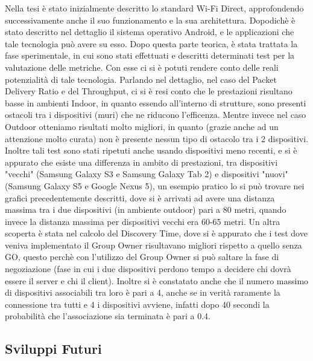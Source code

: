 Nella tesi è stato inizialmente descritto lo standard Wi-Fi Direct, approfondendo successivamente anche il suo funzionamento e la sua architettura.
Dopodichè è stato descritto nel dettaglio il sistema operativo Android, e le applicazioni che tale tecnologia può avere su esso.
Dopo questa parte teorica, è stata trattata la fase sperimentale, in cui sono stati effettuati e descritti determinati test per la valutazione delle metriche.
Con esse ci si è potuti rendere conto delle reali potenzialità di tale tecnologia.
Parlando nel dettaglio, nel caso del Packet Delivery Ratio e del Throughput, ci si è resi conto che le prestazioni risultano basse in ambienti Indoor, in quanto essendo all'interno di strutture, sono presenti ostacoli tra i dispositivi (muri) che ne riducono l'efficenza.
Mentre invece nel caso Outdoor otteniamo risultati molto migliori, in quanto (grazie anche ad un attenzione molto curata) non è presente nessun tipo di ostacolo tra i 2 dispositivi.
Inoltre tali test sono stati ripetuti anche usando dispositivi meno recenti, e si è appurato che esiste una differenza in ambito di prestazioni, tra dispositivi "vecchi" (Samsung Galaxy S3 e Samsung Galaxy Tab 2) e dispositivi "nuovi" (Samsung Galaxy S5 e Google Nexus 5), un esempio pratico lo si può trovare nei grafici precedentemente descritti, dove si è arrivati ad avere una distanza massima tra i due dispositivi (in ambiente outdoor) pari a 80 metri, quando invece la distanza massima per dispositivi vecchi era 60-65 metri.
Un altra scoperta è stata nel calcolo del Discovery Time, dove si è appurato che i test dove veniva implementato il Group Owner risultavano migliori rispetto a quello senza GO, questo perchè con l'utilizzo del Group Owner si può saltare la fase di negoziazione (fase in cui i due dispositivi perdono tempo a decidere chi dovrà essere il server e chi il client).
Inoltre si è constatato anche che il numero massimo di dispositivi associabili tra loro è pari a 4, anche se in verità raramente la connessione tra tutti e 4 i dispositivi avviene, infatti dopo 40 secondi la probabilità che l'associazione sia terminata è pari a 0.4.

\subsection{Sviluppi Futuri}

